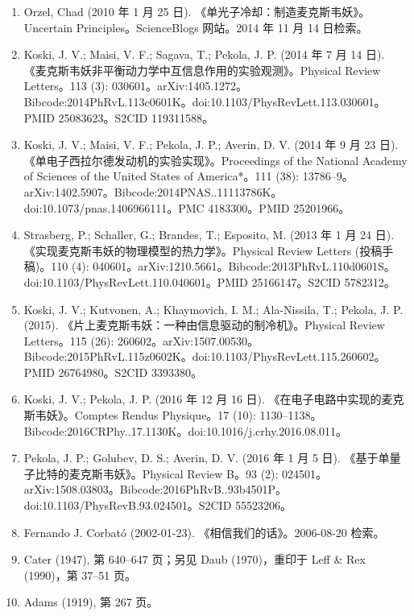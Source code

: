 \begin{enumerate}
\item Orzel, Chad (2010 年 1 月 25 日). 《单光子冷却：制造麦克斯韦妖》。Uncertain Principles。ScienceBlogs 网站。2014 年 11 月 14 日检索。
\item Koski, J. V.; Maisi, V. F.; Sagava, T.; Pekola, J. P. (2014 年 7 月 14 日). 《麦克斯韦妖非平衡动力学中互信息作用的实验观测》。Physical Review Letters。113 (3): 030601。arXiv:1405.1272。Bibcode:2014PhRvL.113c0601K。doi:10.1103/PhysRevLett.113.030601。PMID 25083623。S2CID 119311588。
\item Koski, J. V.; Maisi, V. F.; Pekola, J. P.; Averin, D. V. (2014 年 9 月 23 日). 《单电子西拉尔德发动机的实验实现》。Proceedings of the National Academy of Sciences of the United States of America*。111 (38): 13786–9。arXiv:1402.5907。Bibcode:2014PNAS..11113786K。doi:10.1073/pnas.1406966111。PMC 4183300。PMID 25201966。
\item Strasberg, P.; Schaller, G.; Brandes, T.; Esposito, M. (2013 年 1 月 24 日). 《实现麦克斯韦妖的物理模型的热力学》。Physical Review Letters (投稿手稿)。110 (4): 040601。arXiv:1210.5661。Bibcode:2013PhRvL.110d0601S。doi:10.1103/PhysRevLett.110.040601。PMID 25166147。S2CID 5782312。
\item Koski, J. V.; Kutvonen, A.; Khaymovich, I. M.; Ala-Nissila, T.; Pekola, J. P. (2015). 《片上麦克斯韦妖：一种由信息驱动的制冷机》。Physical Review Letters。115 (26): 260602。arXiv:1507.00530。Bibcode:2015PhRvL.115z0602K。doi:10.1103/PhysRevLett.115.260602。PMID 26764980。S2CID 3393380。
\item Koski, J. V.; Pekola, J. P. (2016 年 12 月 16 日). 《在电子电路中实现的麦克斯韦妖》。Comptes Rendus Physique。17 (10): 1130–1138。Bibcode:2016CRPhy..17.1130K。doi:10.1016/j.crhy.2016.08.011。
\item Pekola, J. P.; Golubev, D. S.; Averin, D. V. (2016 年 1 月 5 日). 《基于单量子比特的麦克斯韦妖》。Physical Review B。93 (2): 024501。arXiv:1508.03803。Bibcode:2016PhRvB..93b4501P。doi:10.1103/PhysRevB.93.024501。S2CID 55523206。
\item Fernando J. Corbató (2002-01-23). 《相信我们的话》。2006-08-20 检索。
\item Cater (1947), 第 640–647 页；另见 Daub (1970)，重印于 Leff & Rex (1990)，第 37–51 页。
\item Adams (1919), 第 267 页。
\end{enumerate}
